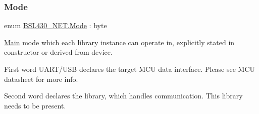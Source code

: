 \subsubsection{\texorpdfstring{Mode}{Mode}}
{\footnotesize\ttfamily enum \mbox{\hyperlink{namespace_b_s_l430___n_e_t_aa1c6981cb6f279b5491d861ca555a1d7}{B\+S\+L430\+\_\+\+N\+E\+T.\+Mode}} \+: byte\hspace{0.3cm}{\ttfamily [strong]}}



\mbox{\hyperlink{namespace_b_s_l430___n_e_t_1_1_main}{Main}} mode which each library instance can operate in, explicitly stated in constructor or derived from device. 

First word U\+A\+R\+T/\+U\+SB declares the target M\+CU data interface. Please see M\+CU datasheet for more info. 

Second word declares the library, which handles communication. This library needs to be present. 

